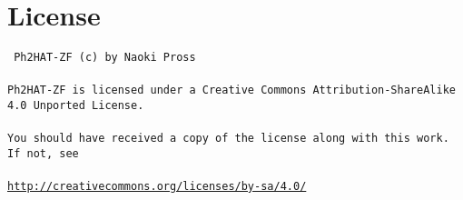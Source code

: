 \documentclass[a4paper, twocolumn]{article}
\numberwithin{equation}{section}
\theoremstyle{hsr-def}
\theoremstyle{hsr-sub}
\theoremstyle{hsr-unnum}
\begin{document}
\section*{License}
{ \tt
Ph2HAT-ZF (c) by Naoki Pross
\\\\
Ph2HAT-ZF is licensed under a Creative Commons Attribution-ShareAlike 4.0 Unported License.
\\\\
You should have received a copy of the license along with this work. If not, see 
\\\\
{\small\url{http://creativecommons.org/licenses/by-sa/4.0/}}
}
\end{document}

